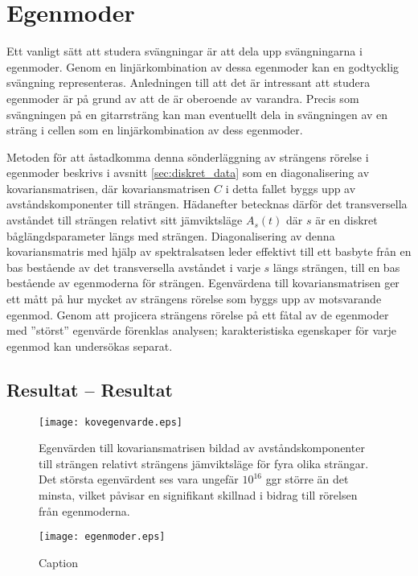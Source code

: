 \section{Egenmoder}
Ett vanligt sätt att studera svängningar är att dela upp svängningarna i egenmoder. Genom en linjärkombination av dessa egenmoder kan en godtycklig svängning representeras. Anledningen till att det är intressant att studera egenmoder är på grund av att de är oberoende av varandra. Precis som  svängningen på en gitarrsträng kan man eventuellt dela in svängningen av en sträng i cellen som en linjärkombination av dess egenmoder. 

Metoden för att åstadkomma denna sönderläggning av strängens rörelse i egenmoder beskrivs i avsnitt \ref{sec:diskret_data} som en diagonalisering av kovariansmatrisen, där kovariansmatrisen $C$ i detta fallet byggs upp av avståndskomponenter till strängen. Hädanefter betecknas därför det transversella avståndet till strängen relativt sitt jämviktsläge $A_s(t)$ där $s$ är en diskret båglängdsparameter längs med strängen. Diagonalisering av denna kovariansmatris med hjälp av spektralsatsen leder effektivt till ett basbyte från en bas bestående av det transversella avståndet i varje $s$ längs strängen, till en bas bestående av egenmoderna för strängen. Egenvärdena till kovariansmatrisen ger ett mått på hur mycket av strängens rörelse som byggs upp av motsvarande egenmod. Genom att projicera strängens rörelse på ett fåtal av de egenmoder med ''störst'' egenvärde förenklas analysen\cite{Shlens_PCA2014}; karakteristiska egenskaper för varje egenmod kan undersökas separat. 



\subsection{Resultat -- Resultat}

\begin{figure}
    \centering
    \texttt{[image: kovegenvarde.eps]}
    \caption{Egenvärden till kovariansmatrisen bildad av avståndskomponenter till strängen relativt strängens jämviktsläge för fyra olika strängar. Det största egenvärdent ses vara ungefär $10^{16}$ ggr större än det minsta, vilket påvisar en signifikant skillnad i bidrag till rörelsen från egenmoderna. }
    \label{fig:kovegenvarde}
\end{figure}

\begin{figure}
    \centering
    \texttt{[image: egenmoder.eps]}
    \caption{Caption}
    \label{fig:egenmoder}
\end{figure}

